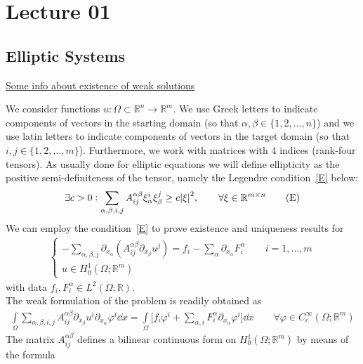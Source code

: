 \chapter{Lecture 01}

\section{Elliptic Systems}

\underline{Some info about existence of weak solutions}

We consider functions \(u: \Omega \subset \mathbb{R}^{n} \to \mathbb{R}^{m}\). We use Greek letters to indicate components of vectors in the starting domain (so that \(\alpha,\beta \in \{1,2,\dots,n\} \)) and we use latin letters to indicate components of vectors in the target domain (so that \(i,j \in \{1,2,\dots,m\} \)). Furthermore, we work with matrices with 4 indices (rank-four tensors). As usually done for elliptic equations we will define ellipticity as the positive semi-definiteness of the tensor, namely the Legendre condition~\eqref{E} below:
\begin{gather}
	\exists c > 0 : \sum_{\alpha,\beta,i,j} A_{ij}^{\alpha\beta} \xi_{\alpha}^{i} \xi_{\beta}^{j} \geq c \abs{\xi}^{2}, \qquad \forall \xi \in \mathbb{R}^{m \times n} \tag{E}\label{E}
\end{gather}
We can employ the condition~\eqref{E} to prove existence and uniqueness results for
\begin{gather}
	\begin{cases}
		- \sum_{\alpha, \beta, j} \partial_{x_\alpha} (A_{ij}^{\alpha \beta} \partial_{x_{\beta}} u^{j}) = f_{i} - \sum_{\alpha}^{} \partial_{x_{\alpha}} F_{i}^{\alpha}\qquad i=1,\dots,m \\
		u \in H_{0}^{1}(\Omega; \mathbb{R}^{m})
	\end{cases} \tag{LS}\label{LS}
\end{gather}
with data \(f_{i},F_{i}^{\alpha} \in L^{2}(\Omega;\mathbb{R})\).\\
The weak formulation of the problem is readily obtained as
\begin{gather}
	\int\limits_{\Omega}^{} \sum_{\alpha, \beta, i,j}^{} A_{ij}^{\alpha \beta} \partial_{x_{\beta}} u^{i} \partial_{x_{\alpha}} \varphi^{i} \dd{x} = \int\limits_{\Omega}^{} \Big[f_{i} \varphi^{i} + \sum_{\alpha,i}^{} F_{i}^{\alpha} \partial_{x_{\alpha}} \varphi^{i} \Big] \dd{x} \qquad \forall \varphi \in C_c^\infty(\Omega;\mathbb{R}^{m})
\end{gather}
The matrix \(A_{ij}^{\alpha \beta}\) defines a bilinear continuous form on \(H_0^1(\Omega;\mathbb{R}^{m})\) by means of the formula
